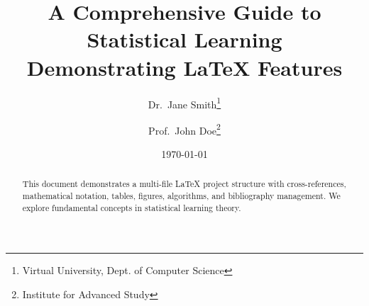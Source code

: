 \documentclass[12pt,a4paper]{article}
\title{A Comprehensive Guide to Statistical Learning\\
       \large Demonstrating LaTeX Features}
\author{Dr.~Jane Smith\thanks{Virtual University, Dept. of Computer Science} \and 
        Prof.~John Doe\thanks{Institute for Advanced Study}}
\date{\today}
\begin{document}
\maketitle

\begin{abstract}
This document demonstrates a multi-file LaTeX project structure
with cross-references, mathematical notation, tables, figures,
algorithms, and bibliography management. We explore fundamental
concepts in statistical learning theory.
\end{abstract}

\tableofcontents
\newpage







\end{document}
